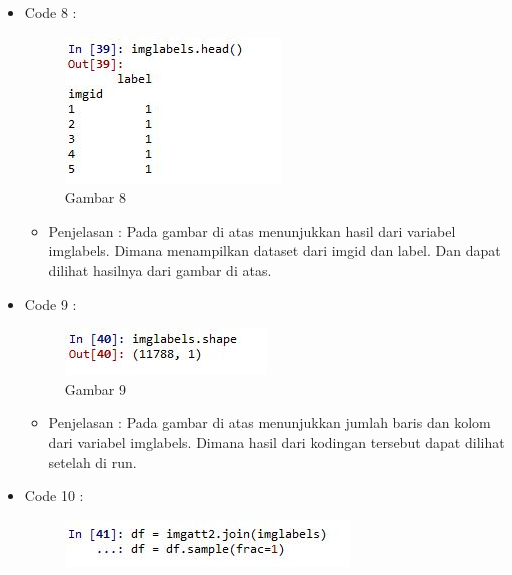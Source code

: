 \begin{enumerate}
\begin{itemize}
\begin{itemize}
\par
\par
\end{itemize}
\item Code 8 :
\par
\begin{figure}[ht]
\centering
\includegraphics[scale=0.2]{figures/pd8.jpg}
\caption{Gambar 8}
\label{contoh}
\end{figure}
\par
\begin{itemize}
\item Penjelasan : Pada gambar di atas menunjukkan hasil dari variabel imglabels. Dimana menampilkan dataset dari imgid dan label. Dan dapat dilihat hasilnya dari gambar di atas.
\par
\par
\end{itemize}
\item Code 9 :
\par
\begin{figure}[ht]
\centering
\includegraphics[scale=0.7]{figures/pd9.jpg}
\caption{Gambar 9}
\label{contoh}
\end{figure}
\par
\begin{itemize}
\item Penjelasan : Pada gambar di atas menunjukkan jumlah baris dan kolom dari variabel imglabels. Dimana hasil dari kodingan tersebut dapat dilihat setelah di run. 
\par
\par
\end{itemize}
\item Code 10 :
\par
\begin{figure}[ht]
\centering
\includegraphics[scale=0.7]{figures/pd10.jpg}

\end{figure}
\end{itemize}
\end{enumerate}
